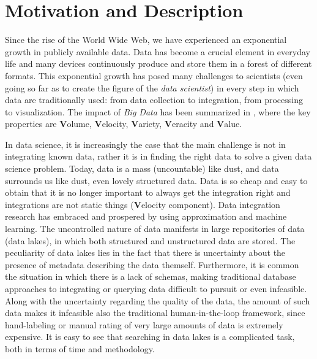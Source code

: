 \section{Motivation and Description}\label{motivations}

Since the rise of the World Wide Web, we have experienced an exponential growth in publicly available data. Data has become a crucial element in everyday life and many devices continuously produce and store them in a forest of different formats. This exponential growth has posed many challenges to scientists (even going so far as to create the figure of the \textit{data scientist}) in every step in which data are traditionally used: from data collection to integration, from processing to visualization. The impact of \textit{Big Data} has been summarized in \cite{mcafee2012big}, where the key properties are \textbf{V}olume, \textbf{V}elocity, \textbf{V}ariety, \textbf{V}eracity and \textbf{V}alue. 

In data science, it is increasingly the case that the main challenge is not in integrating known data, rather it is in finding the right data to solve a given data science problem. Today, data is a mass (uncountable) like dust, and data surrounds us like dust, even lovely structured data. Data is so cheap and easy to obtain that it is no longer important to always get the integration right and integrations are not static things (\textbf{V}elocity component). Data integration research has embraced and prospered by using approximation and machine learning. The uncontrolled nature of data manifests in large repositories of data (data lakes), in which both structured and unstructured data are stored. The peculiarity of data lakes lies in the fact that there is uncertainty about the presence of metadata describing the data themself. Furthermore, it is common the situation in which there is a lack of schemas, making traditional database approaches to integrating or querying data difficult to pursuit or even infeasible. Along with the uncertainty regarding the quality of the data, the amount of such data makes it infeasible also the traditional human-in-the-loop framework, since hand-labeling or manual rating of very large amounts of data is extremely expensive. It is easy to see that searching in data lakes is a complicated task, both in terms of time and methodology. 

